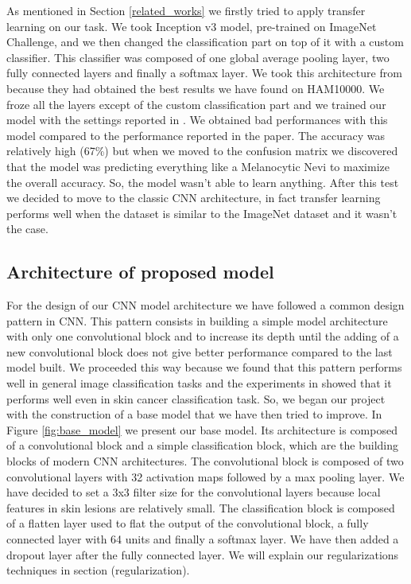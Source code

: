 		As mentioned in Section \ref{related_works} we firstly tried to apply transfer learning on our task. We took Inception v3 model, pre-trained on ImageNet Challenge, and we then changed the classification part on top of it with a custom classifier. This classifier was composed of one global average pooling layer, two fully connected layers and finally a softmax layer. We took this architecture from \cite{article2} because they had obtained the best results we have found on HAM10000. We froze all the layers except of the custom classification part and we trained our model with the settings reported in \cite{article2}. We obtained bad performances with this model compared to the performance reported in the paper. The accuracy was relatively high (67\%) but when we moved to the confusion matrix we discovered that the model was predicting everything like a Melanocytic Nevi to maximize the overall accuracy. So, the model wasn't able to learn anything. After this test we decided to move to the classic CNN architecture, in fact transfer learning performs well when the dataset is similar to the ImageNet dataset and it wasn't the case.
		
	\subsection{Architecture of proposed model}
	
		For the design of our CNN model architecture we have followed a common design pattern in CNN. This pattern consists in building a simple model architecture with only one convolutional block and to increase its depth until the adding of a new convolutional block does not give better performance compared to the last model built. We proceeded this way because we found that this pattern performs well in general image classification tasks and the experiments in \cite{article3} showed that it performs well even in skin cancer classification task. So, we began our project with the construction of a base model that we have then tried to improve. In Figure \ref{fig:base_model} we present our base model. Its architecture is composed of a convolutional block and a simple classification block, which are the building blocks of modern CNN architectures. The convolutional block is composed of two convolutional layers with 32 activation maps followed by a max pooling layer. We have decided to set a 3x3 filter size for the convolutional layers because local features in skin lesions are relatively small. The classification block is composed of a flatten layer used to flat the output of the convolutional block, a fully connected layer with 64 units and finally a softmax layer. We have then added a dropout layer after the fully connected layer. We will explain our regularizations techniques in section (regularization). 
		
